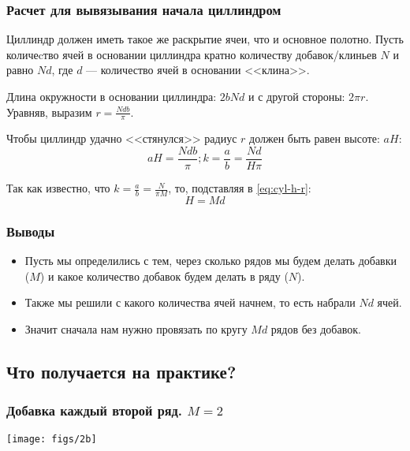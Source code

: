 \begin{frame}
    \frametitle{Расчет для вывязывания начала циллиндром}

	Циллиндр должен иметь такое же раскрытие ячеи, что и основное полотно. Пусть количеcтво ячей в основании циллиндра кратно количеству добавок/клиньев $N$ и равно $Nd$, где $d$ --- количество ячей в основании <<клина>>.
	
	Длина окружности в основании циллиндра: $2bNd$ и с другой стороны: $2\pi r$. Уравняв, выразим $r=\frac{Ndb}{\pi}$.
	
	Чтобы циллиндр удачно <<стянулся>> радиус $r$ должен быть равен высоте: $aH$:
	\begin{equation}
		\label{eq:cyl-h-r}
		aH=\frac{Ndb}{\pi}; k=\frac{a}{b}=\frac{Nd}{H\pi}
	\end{equation}
	
	Так как известно, что $k=\frac{a}{b}=\frac{N}{\pi M}$, то, подставляя в \eqref{eq:cyl-h-r}:
	\begin{equation}
		\label{eq:cyl-h}
		H=Md
	\end{equation}
\end{frame}

\begin{frame}
    \frametitle{Выводы}

	\begin{itemize}
		\item Пусть мы определились с тем, через сколько рядов мы будем делать добавки ($M$) и какое количество добавок будем делать в ряду ($N$).
		\item Также мы решили с какого количества ячей начнем, то есть набрали $Nd$ ячей.
		\item Значит сначала нам нужно провязать по кругу $Md$ рядов без добавок.
	\end{itemize}
\end{frame}


\subsection{Что получается на практике?}

\begin{frame}
    \frametitle{Добавка каждый \alert{второй} ряд. $M=2$}

    \begin{center}
        \texttt{[image: figs/2b]}
    \end{center}
\end{frame}

